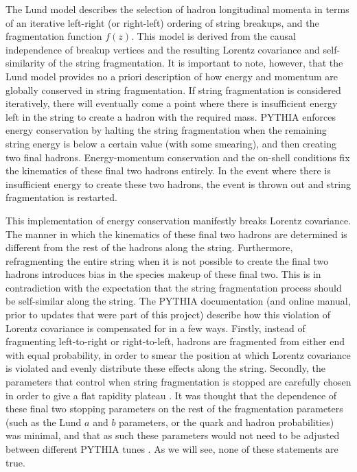 \documentclass[12pt,a4paper]{report}
\begin{document}
The Lund model describes the selection of hadron longitudinal momenta in terms of an iterative left-right (or right-left) ordering of string breakups, and the fragmentation function $f(z)$. This model is derived from the causal independence of breakup vertices and the resulting Lorentz covariance and self-similarity of the string fragmentation. It is important to note, however, that the Lund model provides no a priori description of how energy and momentum are globally conserved in string fragmentation. If string fragmentation is considered iteratively, there will eventually come a point where there is insufficient energy left in the string to create a hadron with the required mass. PYTHIA enforces energy conservation by halting the string fragmentation when the remaining string energy is below a certain value (with some smearing), and then creating two final hadrons. Energy-momentum conservation and the on-shell conditions fix the kinematics of these final two hadrons entirely. In the event where there is insufficient energy to create these two hadrons, the event is thrown out and string fragmentation is restarted.

This implementation of energy conservation manifestly breaks Lorentz covariance. The manner in which the kinematics of these final two hadrons are determined is different from the rest of the hadrons along the string. Furthermore, refragmenting the entire string when it is not possible to create the final two hadrons introduces bias in the species makeup of these final two. This is in contradiction with the expectation that the string fragmentation process should be self-similar along the string. The PYTHIA documentation (and online manual, prior to updates that were part of this project) describe how this violation of Lorentz covariance is compensated for in a few ways. Firstly, instead of fragmenting left-to-right or right-to-left, hadrons are fragmented from either end with equal probability, in order to smear the position at which Lorentz covariance is violated and evenly distribute these effects along the string. Secondly, the parameters that control when string fragmentation is stopped are carefully chosen in order to give a flat rapidity plateau \cite{Bierlich:2022pfr,Sjostrand:2006za}. It was thought that the dependence of these final two stopping parameters on the rest of the fragmentation parameters (such as the Lund $a$ and $b$ parameters, or the quark and hadron probabilities) was minimal, and that as such these parameters would not need to be adjusted between different PYTHIA tunes \cite{PYTHIAmanualold}. As we will see, none of these statements are true.
\end{document}
